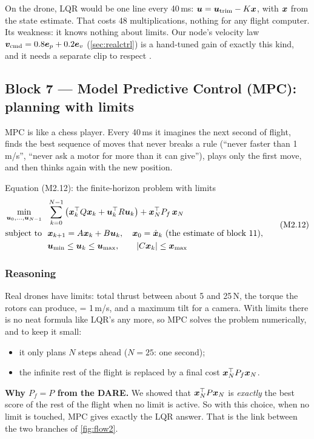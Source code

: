 \begin{real}[LQR]
On the drone, LQR would be one line every 40\,ms: $\bm{u}=\bm{u}_{\text{trim}}-K\bm{x}$, with $\bm{x}$ from the state estimate. That
costs 48 multiplications, nothing for any flight computer. Its weakness: it knows nothing about limits. Our node's
velocity law $\bm{v}_{\text{cmd}}=0.8\bm{e}_p+0.2\bm{e}_v$ (\cref{sec:realctrl}) is a hand-tuned gain of exactly this kind, and it
needs a separate clip to respect .
\end{real}

\subsection{Block 7 --- Model Predictive Control (MPC): planning with limits}
\label{sec:m2b7}

\begin{idea}
MPC is like a chess player. Every 40\,ms it imagines the next second of flight, finds the best sequence of moves that never
breaks a rule (``never faster than 1\,m/s'', ``never ask a motor for more than it can give''), plays only the first move,
and then thinks again with the new position.
\end{idea}

\begin{eqbox}{Equation (M2.12): the finite-horizon problem with limits}
\begin{equation}
\begin{aligned}
  \min_{\vu_0,\dots,\vu_{N-1}}\ \ &\sum_{k=0}^{N-1}\big(\vx_k^\top Q\vx_k+\vu_k^\top R\vu_k\big)+\vx_N^\top P_f\,\vx_N\\
  \text{subject to}\ \ &\vx_{k+1}=A\vx_k+B\vu_k,\quad \vx_0=\hx_k\ \text{(the estimate of block 11)},\\
  &\vu_{\min}\le\vu_k\le\vu_{\max},\qquad |C\vx_k|\le\vx_{\max}
\end{aligned}\tag{M2.12}
\end{equation}
\end{eqbox}

\subsubsection*{Reasoning}
Real drones have limits: total thrust between about 5 and 25\,N, the torque the rotors can produce, 
= 1\,m/s, and a maximum tilt for a camera. With limits there is no neat formula like LQR's any more, so MPC solves the
problem numerically, and to keep it small:
\begin{itemize}
  \item it only plans $N$ steps ahead ($N=25$: one second);
  \item the infinite rest of the flight is replaced by a final cost $\bm{x}_N^\top P_f\bm{x}_N$.
\end{itemize}
\textbf{Why $P_f=P$ from the DARE.} We showed that $\bm{x}_N^\top P\bm{x}_N$ is \emph{exactly} the best score of the rest of the
flight when no limit is active. So with this choice, when no limit is touched, MPC gives exactly the LQR answer.
That is the link between the two branches of \cref{fig:flow2}.

